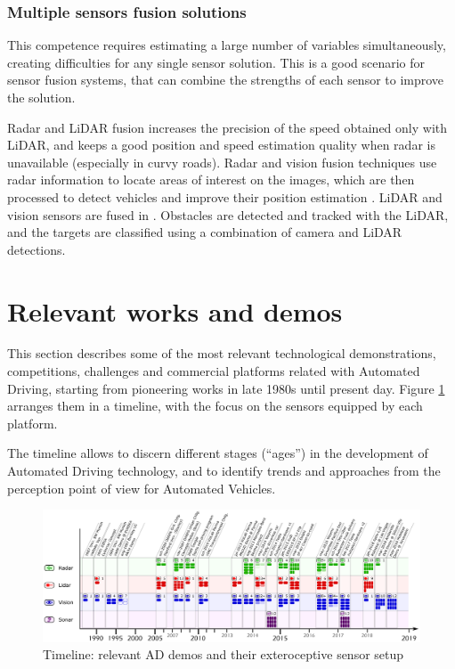 \documentclass[journal]{IEEEtran}
\begin{document}
\subsubsection{Multiple sensors fusion solutions}
This competence requires estimating a large number of variables simultaneously,
creating difficulties for any single sensor solution. This is a good scenario
for sensor fusion systems, that can combine the strengths of each sensor to
improve the solution. 

Radar and LiDAR fusion \cite{gohring2011radar} increases the precision of 
the speed obtained only with LiDAR, and keeps a good position and speed 
estimation quality when radar is unavailable (especially in curvy roads).
Radar and vision fusion techniques use radar information to locate areas of 
interest on the images, which are then processed to detect vehicles and improve 
their position estimation \cite{alessandretti2007vehicle}.
LiDAR and vision sensors are fused in \cite{premebida2007lidar}. Obstacles
are detected and tracked with the LiDAR, and the targets are classified using
a combination of camera and LiDAR detections.

\section{Relevant works and demos}
\label{sec:04-relevantdemos}
This section describes some of the most relevant technological demonstrations, 
competitions, challenges and commercial platforms related with Automated 
Driving, starting from pioneering works in late 1980s until present day. Figure 
\ref{fig:tech-demos} arranges them in a timeline, with the focus on the sensors 
equipped by each platform.

The timeline allows to discern different stages (``ages'') in the development 
of Automated Driving technology, and to identify trends and approaches from the 
perception point of view for Automated Vehicles.

\begin{figure}[p] %
	\includegraphics[width=0.95\textheight,angle=90,keepaspectratio]{"fig3"}%
	\caption{Timeline: relevant AD demos and their exteroceptive sensor 
		setup}
	\label{fig:tech-demos}
\end{figure}
\end{document}
